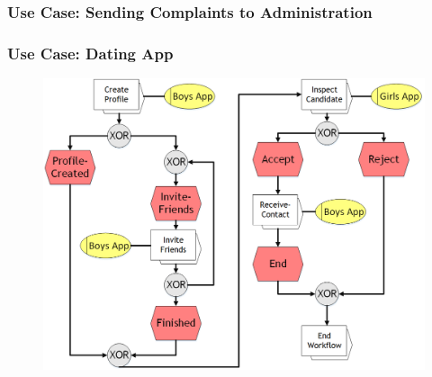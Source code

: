 \begin{frame}[t]
    \frametitle{Use Case: Sending Complaints to Administration}
    
\end{frame}

\begin{frame}
	\plainnumber
    \frametitle{Use Case: Dating App}
    
    \begin{figure}
    	\includegraphics[width= 0.9\linewidth]{Images/DatingApp.png}
    \end{figure}
\end{frame}
